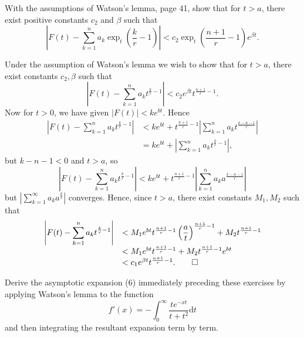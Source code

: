 \begin{problem}\label{problem2chapter3}
With the assumptions of Watson's lemma, page 41, show that for $t > a$, there exist positive constants $c_2$ and $\beta$ such that
$$\left| F(t) - \displaystyle\sum_{k=1}^n a_k \exp_t \left( \dfrac{k}{r} - 1 \right) \right| < c_2 \exp_t \left( \dfrac{n+1}{r} - 1 \right) e^{\beta t}.$$
\end{problem}
\begin{solution}
Under the assumption of Watson's lemma we wish to show that for $t > a$, there exist constants $c_2, \beta$ such that
$$\left| F(t) - \displaystyle\sum_{k=1}^n a_kt^{\frac{k}{r}-1} \right| < c_2 e^{\beta t} t^{\frac{n+1}{r} - 1}.$$
Now for $t > 0$, we have given $|F(t)| < ke^{bt}.$ Hence
$$\begin{array}{ll} \left| F(t) - \displaystyle\sum_{k=1}^n a_k t^{\frac{k}{r}-1} \right| &< k e^{bt} + t^{\frac{n+1}{r}-1} \left| \displaystyle\sum_{k=1}^n a_k t^{\frac{k-n-1}{r}} \right| \\
&= k e^{bt} + \left| \displaystyle\sum_{k=1}^n a_kt^{\frac{k}{r}-1} \right|,
\end{array}$$
but $k-n-1 < 0$ and $t > a$, so
$$\left| F(t) - \displaystyle\sum_{k=1}^n a_k t^{\frac{k}{r}-1} \right| < ke^{bt} + t^{\frac{n+1}{r}-1} \left| \displaystyle\sum_{k=1}^n a_k a^{\frac{k-n-1}{r}} \right|$$
but $\left| \displaystyle\sum_{k=1}^{\infty} a_k a^{\frac{k}{r}} \right|$ converges. Hence, since $t > a$, there exist constants $M_1, M_2$ such that
$$\begin{array}{ll}
\left| F(t) - \displaystyle\sum_{k=1}^n a_k t^{\frac{k}{r}-1} \right| &< M_1 e^{bt} t^{\frac{n+1}{r}-1} \left( \dfrac{a}{t} \right)^{\frac{n+1}{r}-1} + M_2 t^{\frac{n+1}{r}-1} \\
&< M_1 e^{bt} t^{\frac{n+1}{r}-1} + M_2 t^{\frac{n+1}{r}-1} e^{bt} \\
&< c_1 e^{\beta t} t^{\frac{n+1}{r}-1}. \qed
\end{array}$$
\end{solution}
\begin{problem}\label{problem3chapter3}
Derive the asymptotic expansion (6) immediately preceding these exercises by applying Watson's lemma to the function
$$f'(x) = -\displaystyle\int_0^{\infty} \dfrac{te^{-xt}}{t+t^2} \mathrm{d}t$$
and then integrating the resultant expansion term by term.
\end{problem}
